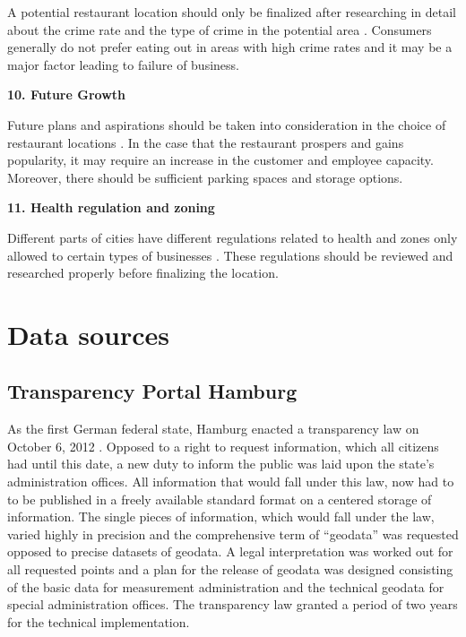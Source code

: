 \documentclass[a4paper, 11pt, oneside]{Thesis}  %
\begin{document}
A potential restaurant location should only be finalized after researching in detail about the crime rate and the type of crime in the potential area \cite{Webstaurantstore.com.25.07.2018}. Consumers generally do not prefer eating out in areas with high crime rates and it may be a major factor leading to failure of business. 

\textbf{10.	Future Growth}

Future plans and aspirations should be taken into consideration in the choice of restaurant locations \cite{Webstaurantstore.com.25.07.2018}. In the case that the restaurant prospers and gains popularity, it may require an increase in the customer and employee capacity. Moreover, there should be sufficient parking spaces and storage options.

\textbf{11.	Health regulation and zoning}

Different parts of cities have different regulations related to health and zones only allowed to certain types of businesses \cite{Webstaurantstore.com.25.07.2018}. These regulations should be reviewed and researched properly before finalizing the location. 




\chapter{Data sources}
\label{Data sources}


\section{Transparency Portal Hamburg}
As the first German federal state, Hamburg enacted a transparency law on October 6, 2012 \cite{Murjahn.2016}. Opposed to a right to request information, which all citizens had until this date, a new duty to inform the public was laid upon the state’s administration offices. All information that would fall under this law, now had to to be published in a freely available standard format on a centered storage of information. The single pieces of information, which would fall under the law, varied highly in precision and the comprehensive term of ``geodata'' was requested opposed to precise datasets of geodata. A legal interpretation was worked out for all requested points and a plan for the release of geodata was designed consisting of the basic data for measurement administration and the technical geodata for special administration offices. The transparency law granted a period of two years for the technical implementation.
\end{document}
